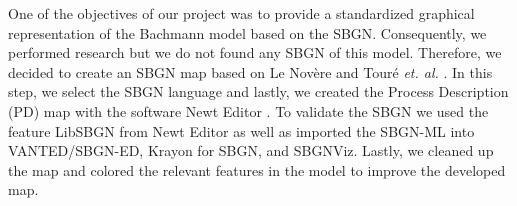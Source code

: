 One of the objectives of our project was to provide a standardized graphical representation of the Bachmann model based on the SBGN.
Consequently, we performed research but we do not found any SBGN of this model. Therefore, we decided to create an SBGN map based on Le Novère \cite{sbgnnovere} and Touré \textit{et. al.} \cite{sbgntoure}.
In this step, we select the SBGN language and lastly, we created the Process Description (PD) map with the software Newt Editor \cite{newteditor}.  To validate the SBGN we used the feature LibSBGN from Newt Editor as well as imported the SBGN-ML into VANTED/SBGN-ED, Krayon for SBGN, and SBGNViz. Lastly, we cleaned up the map and colored the relevant features in the model to improve the developed map.